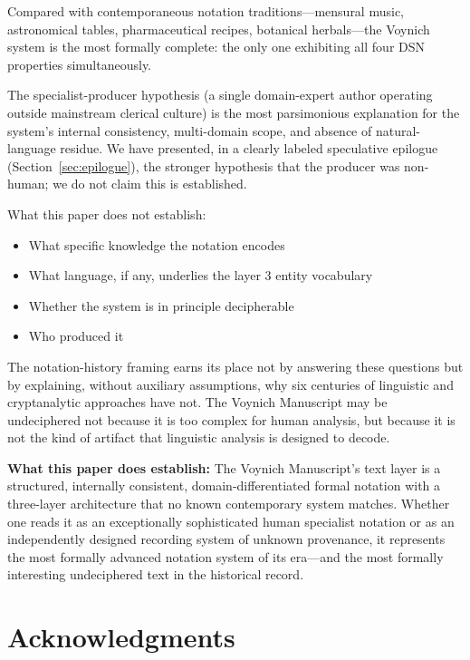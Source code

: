 \documentclass[11pt,a4paper,twocolumn]{article}
\begin{document}
\noindent Compared with contemporaneous notation traditions---mensural music, astronomical tables, pharmaceutical recipes, botanical herbals---the Voynich system is the most formally complete: the only one exhibiting all four DSN properties simultaneously.

The specialist-producer hypothesis (a single domain-expert author operating outside mainstream clerical culture) is the most parsimonious explanation for the system's internal consistency, multi-domain scope, and absence of natural-language residue. We have presented, in a clearly labeled speculative epilogue (Section~\ref{sec:epilogue}), the stronger hypothesis that the producer was non-human; we do not claim this is established.

\medskip

What this paper does not establish:

\begin{itemize}[leftmargin=*,itemsep=2pt]
    \item What specific knowledge the notation encodes
    \item What language, if any, underlies the layer 3 entity vocabulary
    \item Whether the system is in principle decipherable
    \item Who produced it
\end{itemize}

\noindent The notation-history framing earns its place not by answering these questions but by explaining, without auxiliary assumptions, why six centuries of linguistic and cryptanalytic approaches have not. The Voynich Manuscript may be undeciphered not because it is too complex for human analysis, but because it is not the kind of artifact that linguistic analysis is designed to decode.

\medskip
\noindent\textbf{What this paper does establish:} The Voynich Manuscript's text layer is a structured, internally consistent, domain-differentiated formal notation with a three-layer architecture that no known contemporary system matches. Whether one reads it as an exceptionally sophisticated human specialist notation or as an independently designed recording system of unknown provenance, it represents the most formally advanced notation system of its era---and the most formally interesting undeciphered text in the historical record.

\section*{Acknowledgments}
\end{document}
